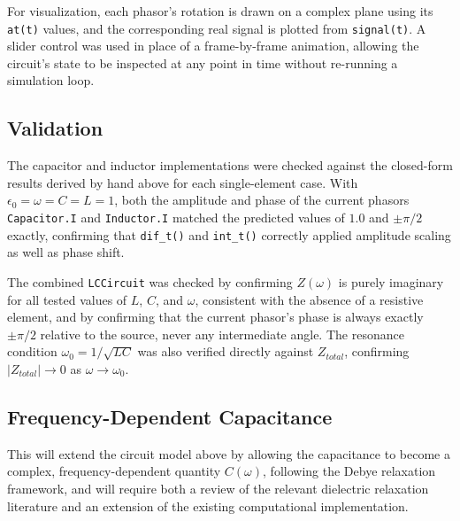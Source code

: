 \documentclass[11pt]{article}
\begin{document}
For visualization, each phasor's rotation is drawn on a complex plane using its \texttt{at(t)} values, and the corresponding real signal is plotted from \texttt{signal(t)}. A slider control was used in place of a frame-by-frame animation, allowing the circuit's state to be inspected at any point in time without re-running a simulation loop.

\subsection{Validation}

The capacitor and inductor implementations were checked against the closed-form results derived by hand above for each single-element case. With $\epsilon_0 = \omega = C = L = 1$, both the amplitude and phase of the current phasors \texttt{Capacitor.I} and \texttt{Inductor.I} matched the predicted values of $1.0$ and $\pm\pi/2$ exactly, confirming that \texttt{dif\_t()} and \texttt{int\_t()} correctly applied amplitude scaling as well as phase shift.

The combined \texttt{LCCircuit} was checked by confirming $Z(\omega)$ is purely imaginary for all tested values of $L$, $C$, and $\omega$, consistent with the absence of a resistive element, and by confirming that the current phasor's phase is always exactly $\pm\pi/2$ relative to the source, never any intermediate angle. The resonance condition $\omega_0 = 1/\sqrt{LC}$ was also verified directly against $Z_{total}$, confirming $|Z_{total}| \to 0$ as $\omega \to \omega_0$.

\subsection{Frequency-Dependent Capacitance}

This will extend the circuit model above by allowing the capacitance to become a complex, frequency-dependent quantity $C(\omega)$, following the Debye relaxation framework, and will require both a review of the relevant dielectric relaxation literature and an extension of the existing computational implementation.



\end{document}
